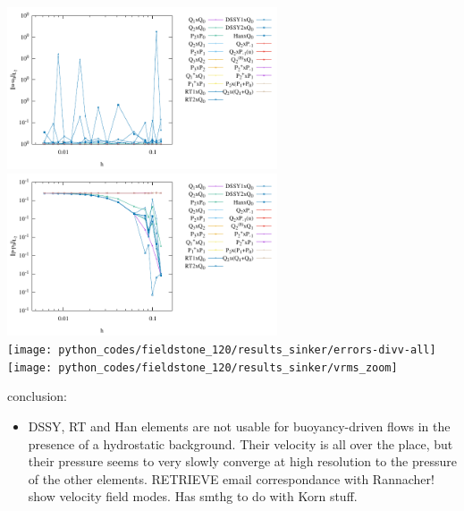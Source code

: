 \begin{center}
\includegraphics[width=8cm]{python_codes/fieldstone_120/results_sinker/errors-velocity-all}
\includegraphics[width=8cm]{python_codes/fieldstone_120/results_sinker/errors-pressure-all}\\
\texttt{[image: python\_codes/fieldstone\_120/results\_sinker/errors-divv-all]}
\texttt{[image: python\_codes/fieldstone\_120/results\_sinker/vrms\_zoom]}
\end{center}




conclusion:

\begin{itemize}
\item DSSY, RT and Han elements are not usable for buoyancy-driven flows in the presence of a hydrostatic 
background. Their velocity is all over the place, but their pressure seems to very slowly 
converge at high resolution to the pressure of the other elements.
RETRIEVE email correspondance with Rannacher! show velocity field modes. Has smthg to do with 
Korn stuff.
\end{itemize}


